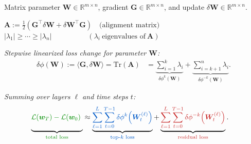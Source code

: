 \documentclass[border=6pt]{standalone}
\newcommand{\bA}{\boldsymbol{A}}
\newcommand{\bG}{\boldsymbol{G}}
\newcommand{\bW}{\boldsymbol{W}}
\newcommand{\bw}{\boldsymbol{w}}
\newcommand{\cL}{\mathcal{L}}
\newcommand{\R}{\mathbb{R}}
\newcommand{\tot}[1]{\textcolor{totcol}{#1}}
\newcommand{\topk}[1]{\textcolor{topcol}{#1}}
\newcommand{\res}[1]{\textcolor{rescol}{#1}}
\begin{document}
\begin{minipage}{0.92\linewidth}

\small
Matrix parameter $\bW \in \R^{m \times n}$, gradient $\bG \in \R^{m \times n}$, and update $\delta \bW \in \R^{m \times n}$.

\vspace{4pt}

\begin{tcolorbox}[
  colback=gray!10,
  colframe=gray!85,
  boxrule=0.8pt,
  arc=2pt,
  left=6pt,right=6pt,top=4pt,bottom=4pt
]
\centering
$\bA := \tfrac12\!\left(\bG^\top \delta \bW + \delta \bW^\top \bG\right)
\quad \text{(alignment matrix)}$\\[2pt]
{\small
\quad \quad $|\lambda_1| \ge \cdots \ge |\lambda_n|
\quad \quad \quad \quad \quad (\lambda_i\ \text{eigenvalues of}\ \bA)$
}
\end{tcolorbox}

\vspace{2pt}
\emph{Stepwise linearized loss change for parameter $\bW$:}
\vspace{-2pt}
\begin{align*}
\delta \phi(\bW) := \langle \bG, \delta \bW\rangle = \mathrm{Tr}(\bA)
&=
\underbrace{\sum_{i=1}^{k}\lambda_i}_{\delta \phi^{k}(\bW)}
+
\underbrace{\sum_{i=k+1}^{n}\lambda_i}_{\delta \phi^{-k}(\bW)} .
\end{align*}

\vspace{-4pt}
\emph{Summing over layers $\ell$ and time steps $t$:}
\vspace{-2pt}
\begin{align*}
\underbrace{\tot{\cL(\bw_T) - \cL(\bw_0)}\;\vphantom{\sum_{\ell=1}^{L}\sum_{t=0}^{T-1}}}_{\tot{\text{total loss}}}
&\approx
\underbrace{
\topk{\displaystyle
\sum_{\ell=1}^{L}\sum_{t=0}^{T-1}
\delta \phi^{k}\!\left(\bW_t^{(\ell)}\right)}
}_{\topk{\text{top-$k$ loss}}}
+
\underbrace{
\res{\displaystyle
\sum_{\ell=1}^{L}\sum_{t=0}^{T-1}
\delta \phi^{-k}\!\left(\bW_t^{(\ell)}\right)}
}_{\res{\text{residual loss}}}.
\end{align*}


\end{minipage}
\end{document}
